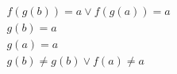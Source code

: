 \begin{align*}
%
& f(g(b)) = a \lor f(g(a)) = a
~\\~
& g(b) = a
~\\~
& g(a) = a
~\\~
& g(b)  \neq  g(b) \lor f(a)  \neq  a
%
\end{align*}
